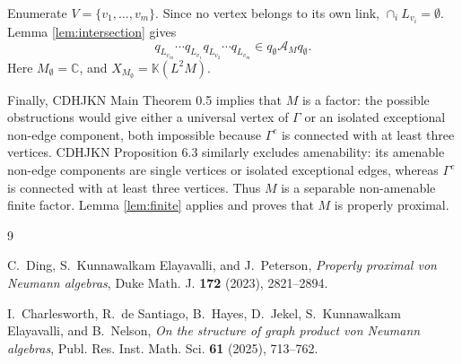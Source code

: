 \documentclass[12pt]{article}
\newcommand{\cA}{\mathcal A}
\newcommand{\C}{\mathbb C}
\begin{document}
Enumerate \(V=\{v_1,\ldots,v_m\}\).  Since no vertex belongs to its own link,
\(\cap_iL_{v_i}=\emptyset\).  Lemma \ref{lem:intersection} gives
\[
 q_{L_{v_m}}\cdots q_{L_{v_1}}q_{L_{v_2}}\cdots q_{L_{v_m}}
 \in q_{\emptyset}\cA_Mq_{\emptyset}.
\]
Here \(M_\emptyset=\C\), and \(X_{M_\emptyset}=\mathbb K(L^2M)\).

Finally, CDHJKN Main Theorem 0.5 implies that \(M\) is a factor: the possible
obstructions would give either a universal vertex of \(\Gamma\) or an isolated
exceptional non-edge component, both impossible because \(\Gamma^c\) is
connected with at least three vertices.  CDHJKN Proposition 6.3 similarly
excludes amenability: its amenable non-edge components are single vertices or
isolated exceptional edges, whereas \(\Gamma^c\) is connected with at least
three vertices.  Thus \(M\) is a separable non-amenable finite factor.
Lemma \ref{lem:finite} applies and proves that \(M\) is properly proximal.

\begin{thebibliography}{9}

C.~Ding, S.~Kunnawalkam Elayavalli, and J.~Peterson,
\emph{Properly proximal von Neumann algebras},
Duke Math. J. \textbf{172} (2023), 2821--2894.

I.~Charlesworth, R.~de Santiago, B.~Hayes, D.~Jekel,
S.~Kunnawalkam Elayavalli, and B.~Nelson,
\emph{On the structure of graph product von Neumann algebras},
Publ. Res. Inst. Math. Sci. \textbf{61} (2025), 713--762.

\end{thebibliography}
\end{document}
